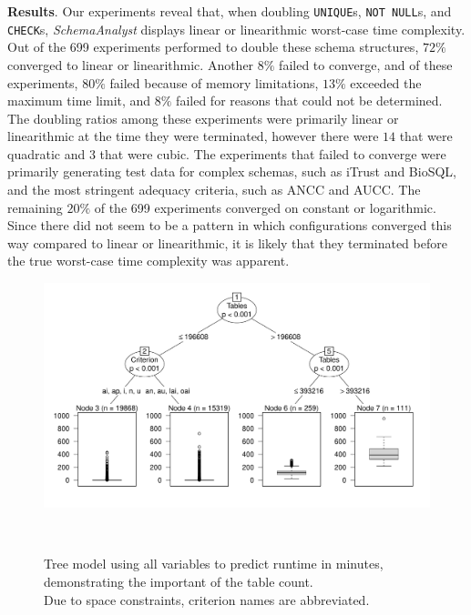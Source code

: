 
\textbf{Results}. Our experiments reveal that, when doubling \texttt{UNIQUE}s, {\tt NOT NULL}s, and {\tt CHECK}s,
\textit{SchemaAnalyst} displays linear or linearithmic worst-case time complexity.  Out of the 699 experiments performed
to double these schema structures, $72\%$ converged to linear or linearithmic.  Another $8\%$ failed to converge, and of
these experiments, $80\%$ failed because of memory limitations, $13\%$ exceeded the maximum time limit, and $8\%$ failed
for reasons that could not be determined.  The doubling ratios among these experiments were primarily linear or
linearithmic at the time they were terminated, however there were $14$ that were quadratic and $3$ that were cubic.  The
experiments that failed to converge were primarily generating test data for complex schemas, such as iTrust and BioSQL,
and the most stringent adequacy criteria, such as ANCC and AUCC. The remaining $20\%$ of the 699 experiments converged
on constant or logarithmic.  Since there did not seem to be a pattern in which configurations converged this way
compared to linear or linearithmic, it is likely that they terminated before the true worst-case time complexity was
apparent.

\begin{figure}[t]
\centering
  \centering
  \includegraphics[width=1.025\linewidth]{diagrams/Tree.pdf}
  \vspace*{-.25in}
  \caption{Tree model using all variables to predict runtime in minutes,
  demonstrating the important of the table count. \\ Due to space
  constraints, criterion names are abbreviated.
  \vspace{-.35in}}~\label{fig:atree}
\end{figure}

